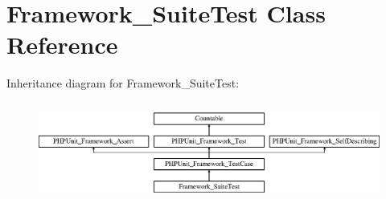 \hypertarget{class_framework___suite_test}{}\section{Framework\+\_\+\+Suite\+Test Class Reference}
\label{class_framework___suite_test}
Inheritance diagram for Framework\+\_\+\+Suite\+Test\+:\begin{figure}[H]
\begin{center}
\leavevmode
\includegraphics[height=3.303835cm]{class_framework___suite_test}
\end{center}
\end{figure}
